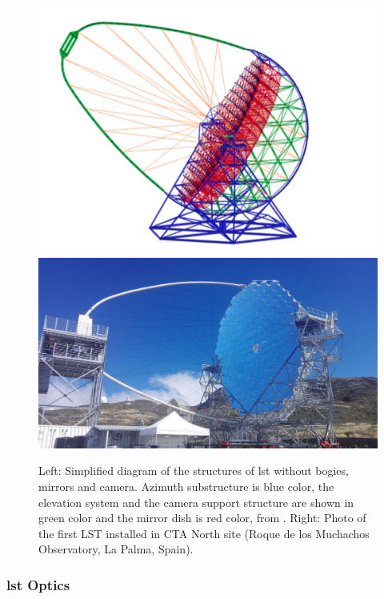 \documentclass[main.tex]{subfiles}
\begin{document}
\begin{figure}[!htb]
  \includegraphics[width=\linewidth]{Pictures/LSTstructure.pdf}
  \endminipage\hfill
  \includegraphics[width=\linewidth]{Pictures/LST1.pdf}
  \endminipage\hfill
  \caption{\label{fig:LST} Left: Simplified diagram of the structures of \gls{lst} without bogies, mirrors and camera. Azimuth substructure is blue color, the elevation system and the camera support structure are shown in green color and the mirror dish is red color, from \cite{2013LST}. Right: Photo of the first LST installed in CTA North site (Roque de los Muchachos Observatory, La Palma, Spain).}
\end{figure}

\subsubsection{\gls{lst} Optics}
\end{document}
